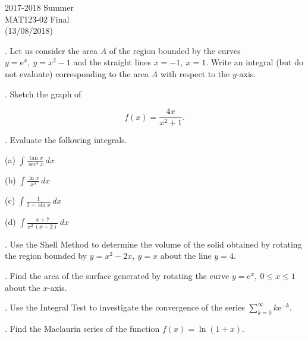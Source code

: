 \documentclass{article}
\begin{document}
\pagestyle{empty}
\large

\begin{center}
2017-2018 Summer \\MAT123-02 Final\\(13/08/2018)
\end{center}

. Let us consider the area $A$ of the region bounded by the curves $y=\mathrm{e}^x,\:y=x^2-1$ and the straight lines $x=-1,\:x=1$. Write an integral (but do not evaluate) corresponding to the area $A$ with respect to the $y$-axis.

\hfill

. Sketch the graph of

\[f(x)=\frac{4x}{x^2+1}.\]

\hfill

. Evaluate the following integrals.


\hfill

\noindent (a) $\displaystyle\int\frac{\tan x}{\sec^4x}\,dx$

\hfill

\hfill

\noindent (b) $\displaystyle\int\frac{\ln x}{x^3}\,dx$

\hfill

\hfill

\noindent (c) $\displaystyle\int\frac1{1+\sin x}\,dx$

\hfill

\hfill

\noindent (d) $\displaystyle\int\frac{x+7}{x^2\,(x+2)}\,dx$

\hfill

\hfill

. Use the Shell Method to determine the volume of the solid obtained by rotating the region bounded by $y=x^2-2x,\:y=x$ about the line $y=4$.

\hfill

. Find the area of the surface generated by rotating the curve $y=\mathrm{e}^x,\:0\leq x\leq1$ about the $x$-axis.

\hfill

. Use the Integral Test to investigate the convergence of the series $\displaystyle\sum_{k=0}^{\infty}k\mathrm{e}^{-k}$.

\hfill

. Find the Maclaurin series of the function $f(x)=\ln(1+x)$.

\hfill
\end{document}
